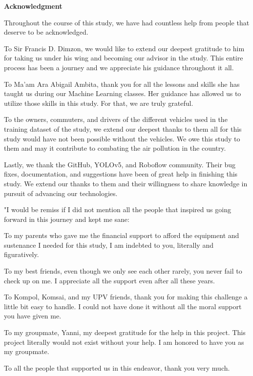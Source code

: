 \doublespacing
\begin{center}
	\textbf{Acknowledgment}
\end{center}

Throughout the course of this study, we have had countless help from people that deserve to be acknowledged.

To Sir Francis D. Dimzon, we would like to extend our deepest gratitude to him for taking us under his wing and becoming our advisor in the study. This entire process has been a journey and we appreciate his guidance throughout it all. 

To Ma'am Ara Abigail Ambita, thank you for all the lessons and skills she has taught us during our Machine Learning classes. Her guidance has allowed us to utilize those skills in this study. For that, we are truly grateful.

To the owners, commuters, and drivers of the different vehicles used in the training dataset of the study, we extend our deepest thanks to them all for this study would have not been possible without the vehicles. We owe this study to them and may it contribute to combating the air pollution in the country.

Lastly, we thank the GitHub, YOLOv5, and Roboflow community. Their bug fixes, documentation, and suggestions have been of great help in finishing this study. We extend our thanks to them and their willingness to share knowledge in pursuit of advancing our technologies.

"I would be remiss if I did not mention all the people that inspired us going forward in this journey and kept me sane:

To my parents who gave me the financial support to afford the equipment and sustenance I needed for this study, I am indebted to you, literally and figuratively.

To my best friends, even though we only see each other rarely, you never fail to check up on me. I appreciate all the support even after all these years.

To Kompol, Komsai, and my UPV friends, thank you for making this challenge a little bit easy to handle. I could not have done it without all the moral support you have given me.

To my groupmate, Yanni, my deepest gratitude for the help in this project. This project literally would not exist without your help. I am honored to have you as my groupmate.

To all the people that supported us in this endeavor, thank you very much.

